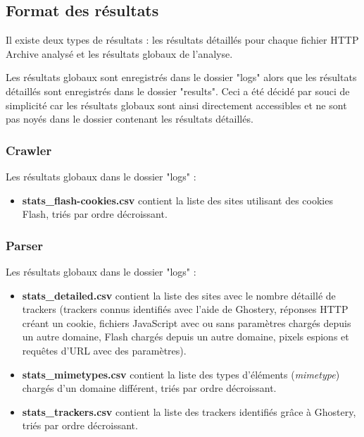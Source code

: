\subsection{Format des résultats}
Il existe deux types de résultats : les résultats détaillés pour chaque fichier HTTP Archive analysé et les résultats globaux de l'analyse.

Les résultats globaux sont enregistrés dans le dossier "logs" alors que les résultats détaillés sont enregistrés dans le dossier "results".
Ceci a été décidé par souci de simplicité car les résultats globaux sont ainsi directement accessibles et ne sont pas noyés dans le dossier contenant les résultats détaillés.

\subsubsection{Crawler}
Les résultats globaux dans le dossier "logs" :
\begin{itemize}
	\item \textbf{stats\_flash-cookies.csv} contient la liste des sites utilisant des cookies Flash, triés par ordre décroissant.
\end{itemize}

\subsubsection{Parser}
Les résultats globaux dans le dossier "logs" :
\begin{itemize}
	\item \textbf{stats\_detailed.csv} contient la liste des sites avec le nombre détaillé de trackers (trackers connus identifiés avec l'aide de Ghostery, réponses HTTP créant un cookie, fichiers JavaScript avec ou sans paramètres chargés depuis un autre domaine, Flash chargés depuis un autre domaine, pixels espions et requêtes d'URL avec des paramètres).
	\item \textbf{stats\_mimetypes.csv} contient la liste des types d'éléments (\textit{mimetype}) chargés d'un domaine différent, triés par ordre décroissant.
	\item \textbf{stats\_trackers.csv} contient la liste des trackers identifiés grâce à Ghostery, triés par ordre décroissant.
	\newline
\end{itemize}

